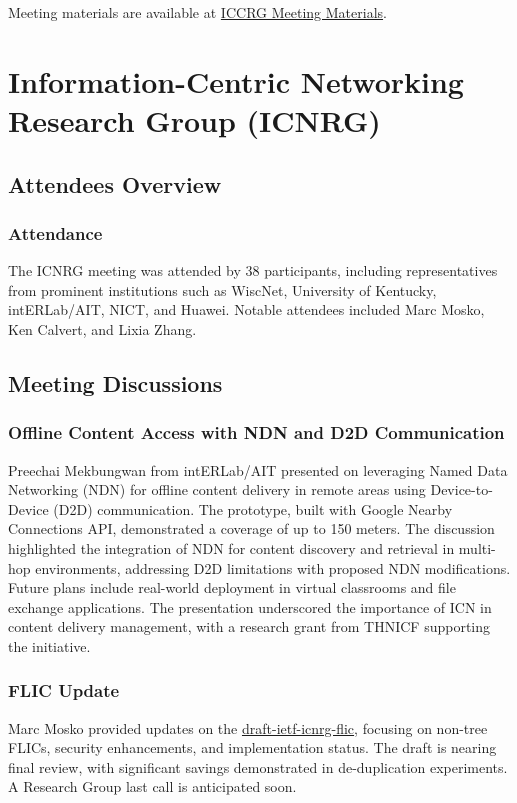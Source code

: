 \documentclass{article}
\begin{document}
Meeting materials are available at \href{https://datatracker.ietf.org/meeting/122/materials/iccrg}{ICCRG Meeting Materials}.




\newpage

\section{Information-Centric Networking Research Group (ICNRG)}

\subsection{Attendees Overview}
\subsubsection{Attendance}
The ICNRG meeting was attended by 38 participants, including representatives from prominent institutions such as WiscNet, University of Kentucky, intERLab/AIT, NICT, and Huawei. Notable attendees included Marc Mosko, Ken Calvert, and Lixia Zhang.

\subsection{Meeting Discussions}

\subsubsection{Offline Content Access with NDN and D2D Communication}
Preechai Mekbungwan from intERLab/AIT presented on leveraging Named Data Networking (NDN) for offline content delivery in remote areas using Device-to-Device (D2D) communication. The prototype, built with Google Nearby Connections API, demonstrated a coverage of up to 150 meters. The discussion highlighted the integration of NDN for content discovery and retrieval in multi-hop environments, addressing D2D limitations with proposed NDN modifications. Future plans include real-world deployment in virtual classrooms and file exchange applications. The presentation underscored the importance of ICN in content delivery management, with a research grant from THNICF supporting the initiative.

\subsubsection{FLIC Update}
Marc Mosko provided updates on the \href{https://datatracker.ietf.org/doc/html/draft-ietf-icnrg-flic}{draft-ietf-icnrg-flic}, focusing on non-tree FLICs, security enhancements, and implementation status. The draft is nearing final review, with significant savings demonstrated in de-duplication experiments. A Research Group last call is anticipated soon.
\end{document}

